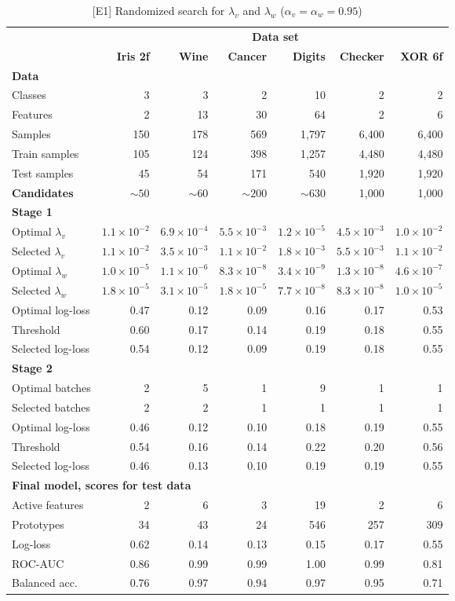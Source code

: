 %
\begin{table}
\caption{[E1] Randomized search for $\lambda_v$ and $\lambda_w$ ($\alpha_v=\alpha_w=0.95$)}
\label{tab_e1}
%
\begin{center}
\small
\begin{tabular}{|lrrrrrr|}
\hline
&\multicolumn{6}{c|}{\textbf{\hrulefill\ Data set \hrulefill}}\\
&\textbf{Iris 2f}&\textbf{Wine}&\textbf{Cancer}&\textbf{Digits}&\textbf{Checker}&\textbf{XOR 6f}\\
\multicolumn{7}{|l|}{\textbf{Data}}\\
Classes&3&3&2&10&2&2\\
Features&2&13&30&64&2&6\\
Samples&150&178&569&1,797&6,400&6,400\\
Train samples&105&124&398&1,257&4,480&4,480\\
Test samples&45&54&171&540&1,920&1,920\\
\textbf{Candidates}&$\sim50$&$\sim60$&$\sim200$&$\sim630$&1,000&1,000\\
\multicolumn{7}{|l|}{\textbf{Stage 1}}\\
Optimal $\lambda_v$&$1.1\times10^{-2}$&$6.9\times10^{-4}$&$5.5\times10^{-3}$&$1.2\times10^{-5}$&$4.5\times10^{-3}$&$1.0\times10^{-2}$\\
Selected $\lambda_v$&$1.1\times10^{-2}$&$3.5\times10^{-3}$&$1.1\times10^{-2}$&$1.8\times10^{-3}$&$5.5\times10^{-3}$&$1.1\times10^{-2}$\\
Optimal $\lambda_w$&$1.0\times10^{-5}$&$1.1\times10^{-6}$&$8.3\times10^{-8}$&$3.4\times10^{-9}$&$1.3\times10^{-8}$&$4.6\times10^{-7}$\\
Selected $\lambda_w$&$1.8\times10^{-5}$&$3.1\times10^{-5}$&$1.8\times10^{-5}$&$7.7\times10^{-8}$&$8.3\times10^{-8}$&$1.0\times10^{-5}$\\
Optimal log-loss&0.47&0.12&0.09&0.16&0.17&0.53\\
Threshold&0.60&0.17&0.14&0.19&0.18&0.55\\
Selected log-loss&0.54&0.12&0.09&0.19&0.18&0.55\\
\multicolumn{7}{|l|}{\textbf{Stage 2}}\\
Optimal batches&2&5&1&9&1&1\\
Selected batches&2&2&1&1&1&1\\
Optimal log-loss&0.46&0.12&0.10&0.18&0.19&0.55\\
Threshold&0.54&0.16&0.14&0.22&0.20&0.56\\
Selected log-loss&0.46&0.13&0.10&0.19&0.19&0.55\\
\multicolumn{7}{|l|}{\textbf{Final model, scores for test data}}\\
Active features&2&6&3&19&2&6\\
Prototypes&34&43&24&546&257&309\\
Log-loss&0.62&0.14&0.13&0.15&0.17&0.55\\
ROC-AUC&0.86&0.99&0.99&1.00&0.99&0.81\\
Balanced acc.&0.76&0.97&0.94&0.97&0.95&0.71\\
\hline
\end{tabular}
\end{center}
\end{table}
